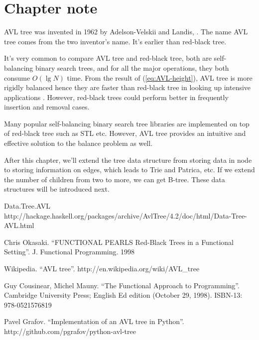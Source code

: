\documentclass[UTF8]{article}
\begin{document}
\section{Chapter note}
AVL tree was invented in 1962 by Adelson-Velskii and Landis\cite{wiki},
\cite{TFATP}. The name AVL tree comes from the two inventor's name. It's earlier than red-black tree.

It's very common to compare AVL tree and red-black tree, both are self-balancing binary search trees, and for all the major operations, they both consume $O(\lg N)$ time. From the result of (\ref{eq:AVL-height}), AVL tree is more rigidly balanced hence they are faster than red-black tree in looking up intensive applications \cite{wiki}. However, red-black trees could perform better in frequently insertion and removal cases.

Many popular self-balancing binary search tree libraries are implemented on top of red-black tree such as STL etc. However, AVL tree provides an intuitive and effective solution to the balance problem as well.

After this chapter, we'll extend the tree data structure from storing data in node to storing information on edges, which leads to Trie and Patrica, etc. If we extend the number of children from two to more, we can get B-tree. These data structures will be introduced next.

\begin{thebibliography}{99}

Data.Tree.AVL http://hackage.haskell.org/packages/archive/AvlTree/4.2/doc/html/Data-Tree-AVL.html

Chris Okasaki. ``FUNCTIONAL PEARLS Red-Black Trees in a Functional Setting''. J. Functional Programming. 1998

Wikipedia. ``AVL tree''. http://en.wikipedia.org/wiki/AVL\_tree

Guy Cousinear, Michel Mauny. ``The Functional Approach to Programming''. Cambridge University Press; English Ed edition (October 29, 1998). ISBN-13: 978-0521576819

Pavel Grafov. ``Implementation of an AVL tree in Python''. http://github.com/pgrafov/python-avl-tree
\end{thebibliography}

\ifx\wholebook\relax\else
\end{document}
